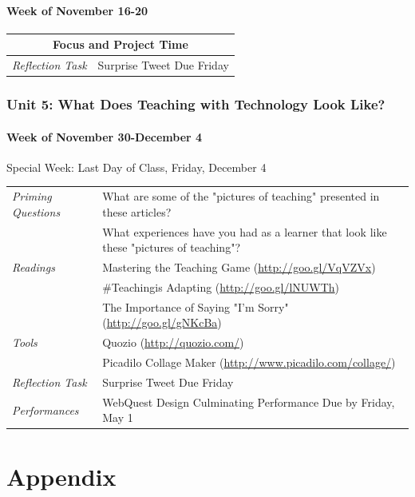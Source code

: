 \documentclass{tufte-handout}
\newcommand{\tabpq}{\faQuestionSign\medspace\textit{Priming Questions}}
\newcommand{\tabread}{\faBook\medspace\textit{Readings}}
\newcommand{\tabtools}{\faWrench\medspace\textit{Tools}}
\newcommand{\tabtweet}{\faLightbulb\medspace\textit{Reflection Task} & Surprise Tweet Due Friday \\}
\newcommand{\tabperformance}{\faTasks\medspace\textit{Performances}}
\newenvironment{tabsched}
	{\small
	\begin{tabular}{p{1.5in}p{4.5in}}
	\toprule}
	{\bottomrule
	\end{tabular}
	\normalsize}
\newenvironment{specweek}
	{\begin{center}
		\fontseries{b} \faBullhorn \medspace Special Week: }
		{\medspace \faBullhorn \fontseries{m}
	\end{center}}
\newcommand{\weekfourteen}{November 16-20}
\newcommand{\weekfifteen}{November 30-December 4}
\newcommand{\finisemester}{Last Day of Class, Friday, December 4}
\begin{document}
\subsection{Week of \weekfourteen}

\begin{tabsched}
	\multicolumn{2}{c}{\textbf{Focus and Project Time}} \\
	\midrule
	\tabtweet
\end{tabsched}

\section{Unit 5: What Does Teaching with Technology Look Like?}

\subsection{Week of \weekfifteen}

\begin{specweek}\finisemester\end{specweek}

\begin{tabsched}
	\tabpq & What are some of the "pictures of teaching" presented in these articles? \\
	& What experiences have you had as a learner that look like these "pictures of teaching"? \\
	\midrule
	\tabread & Mastering the Teaching Game (\url{http://goo.gl/VqVZVx}) \\
	& \#Teachingis Adapting (\url{http://goo.gl/lNUWTh}) \\
	& The Importance of Saying "I'm Sorry" (\url{http://goo.gl/gNKcBa}) \\
	\midrule
	\tabtools & Quozio (\url{http://quozio.com/}) \\
	& Picadilo Collage Maker (\url{http://www.picadilo.com/collage/}) \\
	\midrule
	\tabtweet
	\midrule
	\tabperformance & WebQuest Design Culminating Performance Due by Friday, May 1 \\
\end{tabsched}

\newpage



\newpage

\part{Appendix}
\end{document}
